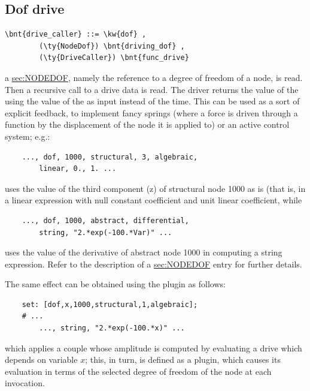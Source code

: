 \subsection{Dof drive}\label{sec:DRIVE:DOF}
\begin{Verbatim}[commandchars=\\\{\}]
    \bnt{drive_caller} ::= \kw{dof} ,
        (\ty{NodeDof}) \bnt{driving_dof} ,
        (\ty{DriveCaller}) \bnt{func_drive}
\end{Verbatim}
a \hyperref{\ty{NodeDof}}{\ty{NodeDof} (see Section~}{)}{sec:NODEDOF}, 
namely the reference to a degree of freedom of a node, is read. 
Then a recursive call to a drive data is read. 
The driver returns the value of the  
 using the value of the 
 as input instead of the time. 
This can be used as a sort of explicit feedback, to implement fancy
springs (where a force is driven through a function by the displacement
of the node it is applied to) or an active control system; e.g.:
\begin{verbatim}
    ..., dof, 1000, structural, 3, algebraic, 
        linear, 0., 1. ...
\end{verbatim}
uses the value of the third component (z) of structural node 1000 
as is (that is, in a linear expression with null constant coefficient 
and unit linear coefficient, while
\begin{verbatim}
    ..., dof, 1000, abstract, differential, 
        string, "2.*exp(-100.*Var)" ...
\end{verbatim}
uses the value of the derivative of abstract node 1000 in computing 
a string expression.
Refer to the description of a 
\hyperref{\ty{NodeDof}}{\ty{NodeDof} (see Section~}{)}{sec:NODEDOF}
entry for further details.

The same effect can be obtained using the  plugin as follows:
\begin{verbatim}
    set: [dof,x,1000,structural,1,algebraic];
    # ...
        ..., string, "2.*exp(-100.*x)" ...
\end{verbatim}
which applies a couple whose amplitude is computed by evaluating
a  drive which depends on variable $x$; this, in turn,
is defined as a  plugin, which causes its evaluation
in terms of the selected degree of freedom of the node at each invocation.

